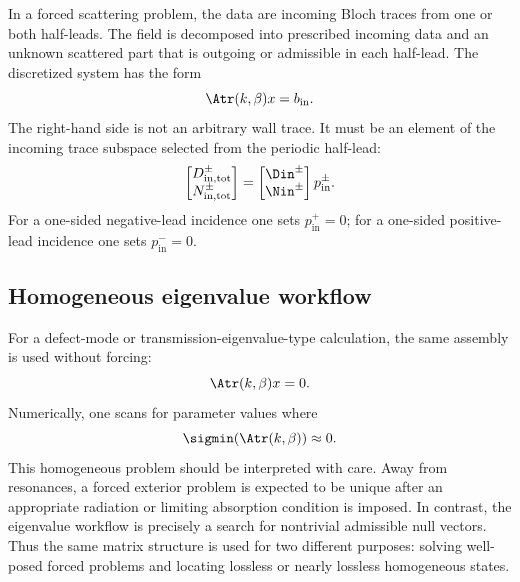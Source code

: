 In a forced scattering problem, the data are incoming Bloch traces from one or
both half-leads.  The field is decomposed into prescribed incoming data and an
unknown scattered part that is outgoing or admissible in each half-lead.  The
discretized system has the form
\[
  \Atr(k,\beta)x=b_{\mathrm{in}} .
\]
The right-hand side is not an arbitrary wall trace.  It must be an element of
the incoming trace subspace selected from the periodic half-lead:
\[
  \begin{bmatrix}
  D_{\mathrm{in,tot}}^\pm\\
  N_{\mathrm{in,tot}}^\pm
  \end{bmatrix}
  =
  \begin{bmatrix}
  \Din^\pm\\
  \Nin^\pm
  \end{bmatrix}p_{\mathrm{in}}^\pm .
\]
For a one-sided negative-lead incidence one sets \(p_{\mathrm{in}}^+=0\); for a
one-sided positive-lead incidence one sets \(p_{\mathrm{in}}^-=0\).

\subsection{Homogeneous eigenvalue workflow}

For a defect-mode or transmission-eigenvalue-type calculation, the same assembly
is used without forcing:
\[
  \Atr(k,\beta)x=0 .
\]
Numerically, one scans for parameter values where
\[
  \sigmin(\Atr(k,\beta))\approx 0 .
\]
This homogeneous problem should be interpreted with care.  Away from resonances,
a forced exterior problem is expected to be unique after an appropriate
radiation or limiting absorption condition is imposed.  In contrast, the
eigenvalue workflow is precisely a search for nontrivial admissible null vectors.
Thus the same matrix structure is used for two different purposes: solving
well-posed forced problems and locating lossless or nearly lossless homogeneous
states.
